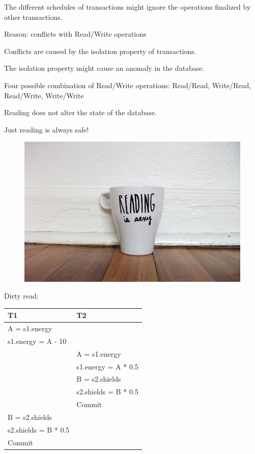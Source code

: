 \documentclass{beamer}
\begin{document}
\begin{slide}{
	\item The different schedules of transactions might ignore the operations finalized by other transactions.
	\item Reason: conflicts with Read/Write operations
	\item Conflicts are caused by the isolation property of transactions.
	\item The isolation property might cause an anomaly in the database.
	\item Four possible combination of Read/Write operations: Read/Read, Write/Read, Read/Write, Write/Write
}\end{slide}

\begin{slide}{
	\item Reading does not alter the state of the database.
	\item Just reading is always safe!
	
	\begin{figure}
		\includegraphics[scale=0.25]{img/reading}
	\end{figure}
}\end{slide}

\begin{slide}{
\item Dirty read:
\begin{table}
	\tiny
	\begin{tabular}{l|l}
		T1 & T2\\
		\hline
		A = s1.energy & \\
		s1.energy = A - 10 & \\
		& A = s1.energy \\
		& s1.energy = A * 0.5 \\
		& B = s2.shields \\
		& s2.shields = B * 0.5 \\
		& Commit \\
		B = s2.shields & \\
		s2.shields = B * 0.5 & \\
		Commit & \\
	\end{tabular}
\end{table}	
}\end{slide}
\end{document}
